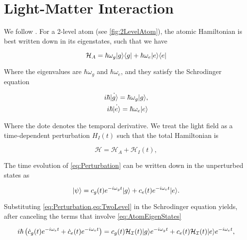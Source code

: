 \chapter{Light-Matter Interaction}\label{ch:LightMatter}

We follow \cite{Leeuwen2017}. For a 2-level atom (see \cref{fig:2LevelAtom}), the atomic Hamiltonian is best written down in its eigenstates, such that we have 

\begin{equation}\label{eq:AtomHamiltonian}
	\mathcal{H}_A = \hbar \omega_g \lvert g\rangle\langle g\rvert + \hbar \omega_e \lvert e\rangle\langle e\rvert
\end{equation}

Where the eigenvalues are $\hbar \omega_g$ and $\hbar \omega_e$, and they satisfy the Schrodinger equation

\begin{subequations}\label{eq:AtomEigenStates}
	\begin{align}
		i \hbar \dot{\lvert g\rangle}= \hbar \omega_g \lvert g\rangle, \\
		i \hbar \dot{\lvert e\rangle}= \hbar \omega_e \lvert e\rangle
	\end{align}
\end{subequations}

Where the dote denotes the temporal derivative. We treat the light field as a time-dependent perturbation $H_{I}(t)$ such that the total Hamiltonian is

\begin{equation}\label{eq:Perturbation}
	\mathcal{H} = \mathcal{H}_A + \mathcal{H}_{I}(t),
\end{equation}

The time evolution of \cref{eq:Perturbation} can be written down in the unperturbed states as

\begin{equation}\label{eq:TwoLevel}
	\lvert\psi\rangle = c_g(t) e^{-i \omega_g t} \lvert g\rangle + c_e(t) e^{-i \omega_e t} \lvert e\rangle.
\end{equation}

Substituting \cref{eq:Perturbation,eq:TwoLevel} in the Schrodinger equation yields, after canceling the terms that involve \cref{eq:AtomEigenStates} 

\begin{equation}\label{eq:TwoLevelSchroedinger}
	i \hbar \left(\dot{c}_g(t) e^{-i \omega_e t}+\dot{c}_e(t) e^{-i \omega_e t} \right) = c_g(t) \mathcal{H_I}(t)\lvert g\rangle e^{-i \omega_g t} + c_e(t) \mathcal{H_I}(t) \lvert e\rangle e^{-i \omega_e t},
\end{equation}

